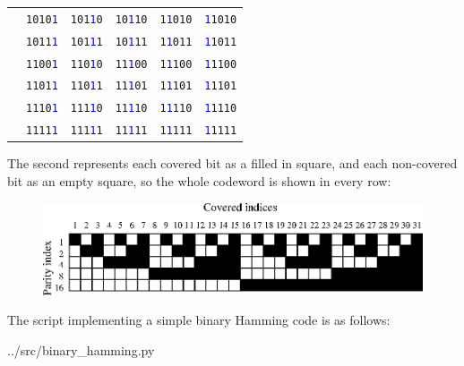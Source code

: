 \documentclass{article}
\begin{document}
\begin{center}
\begin{tabular}{l|rrrrr}
    & \texttt{1010\textcolor{blue}{1}} & \texttt{101\textcolor{blue}{1}0} & \texttt{10\textcolor{blue}{1}10} & \texttt{1\textcolor{blue}{1}010} & \texttt{\textcolor{blue}{1}1010} \\
    & \texttt{1011\textcolor{blue}{1}} & \texttt{101\textcolor{blue}{1}1} & \texttt{10\textcolor{blue}{1}11} & \texttt{1\textcolor{blue}{1}011} & \texttt{\textcolor{blue}{1}1011} \\
    & \texttt{1100\textcolor{blue}{1}} & \texttt{110\textcolor{blue}{1}0} & \texttt{11\textcolor{blue}{1}00} & \texttt{1\textcolor{blue}{1}100} & \texttt{\textcolor{blue}{1}1100} \\
    & \texttt{1101\textcolor{blue}{1}} & \texttt{110\textcolor{blue}{1}1} & \texttt{11\textcolor{blue}{1}01} & \texttt{1\textcolor{blue}{1}101} & \texttt{\textcolor{blue}{1}1101} \\
    & \texttt{1110\textcolor{blue}{1}} & \texttt{111\textcolor{blue}{1}0} & \texttt{11\textcolor{blue}{1}10} & \texttt{1\textcolor{blue}{1}110} & \texttt{\textcolor{blue}{1}1110} \\
    & \texttt{1111\textcolor{blue}{1}} & \texttt{111\textcolor{blue}{1}1} & \texttt{11\textcolor{blue}{1}11} & \texttt{1\textcolor{blue}{1}111} & \texttt{\textcolor{blue}{1}1111} \\
    \bottomrule
    \end{tabular}
\end{center}

    The second represents each covered bit as a filled in square, and each
    non-covered bit as an empty square, so the whole codeword is shown in every
    row:

\begin{figure}[h]
\begin{center}
\includegraphics{../psfiles/hamming_visualisation.eps}
\end{center}
\end{figure}

    The script implementing a simple binary Hamming code is as follows:


{../src/binary_hamming.py}
\end{document}
